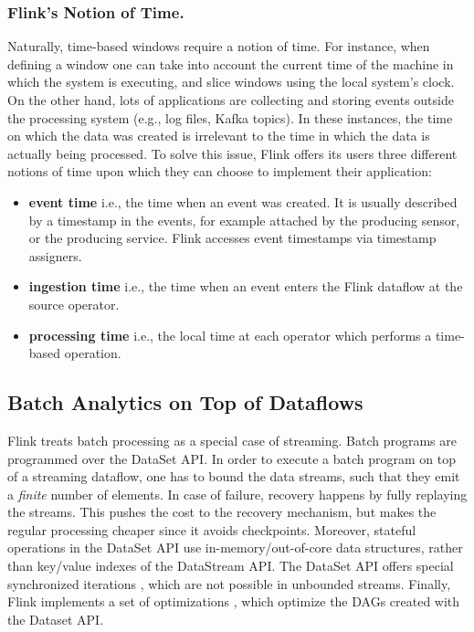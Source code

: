 \documentclass{llncs}
\begin{document}
\subsubsection{Flink's Notion of Time.} Naturally, time-based windows require a notion of time. For instance, when defining a window one can take into account the current time of the machine in which the system is executing, and slice windows using the local system's clock. On the other hand, lots of applications are collecting and storing events outside the processing system (e.g., log files, Kafka topics). In these instances, the time on which the data was created is irrelevant to the time in which the data is actually being processed. To solve this issue, Flink offers its users three different notions of time upon which they can choose to implement their application:
\begin{itemize}
    \item \textbf{event time} i.e., the time when an event was created. It is usually described by a timestamp in the events, for example attached by the producing sensor, or the producing service. Flink accesses event timestamps via timestamp assigners.
    \item \textbf{ingestion time} i.e., the time when an event enters the Flink dataflow at the source operator.
    \item \textbf{processing time} i.e., the local time at each operator which performs a time-based operation.
\end{itemize}



\subsection{Batch Analytics on Top of Dataflows}
Flink treats batch processing as a special case of streaming. Batch programs are programmed over the DataSet API. In order to execute a batch program on top of a streaming dataflow, one has to bound the data streams, such that they emit a \textit{finite} number of elements. In case of failure, recovery happens by fully replaying the streams. This pushes the cost to the recovery mechanism, but makes the regular processing cheaper since it avoids checkpoints. Moreover, stateful operations in the DataSet API use in-memory/out-of-core data structures, rather than key/value indexes of the DataStream API. The DataSet API offers special synchronized iterations \cite{DBLP:journals/pvldb/EwenTKM12}, which are not possible in unbounded streams. Finally, Flink implements a set of optimizations \cite{blackBoxes}, which optimize the DAGs created with the Dataset API.
\end{document}
